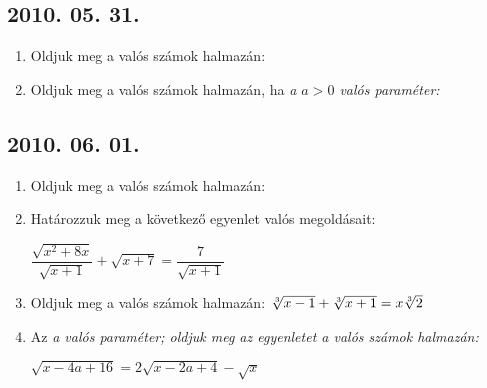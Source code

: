 \subsection*{2010. 05. 31.}

\begin{enumerate}

\item Oldjuk meg a valós számok halmazán:

\item Oldjuk meg a valós számok halmazán, ha \it a \rm $a>0$ valós paraméter:
\end{enumerate}
\subsection*{2010. 06. 01.}

\begin{enumerate}

\item Oldjuk meg a valós számok halmazán:

\item Határozzuk meg a következő egyenlet valós megoldásait:

$\dfrac{\sqrt{x^2+8x}}{\sqrt{x+1}}+\sqrt{x+7}=\dfrac{7}{\sqrt{x+1}}$

\item Oldjuk meg a valós számok halmazán: 
$\root3\of{x-1}+\root3\of{x+1}=x\root3\of{2}$

\item Az \it a \rm valós paraméter; oldjuk meg az egyenletet a valós számok halmazán:

$\sqrt{x-4a+16}=2\sqrt{x-2a+4}-\sqrt{x}$
\end{enumerate}
